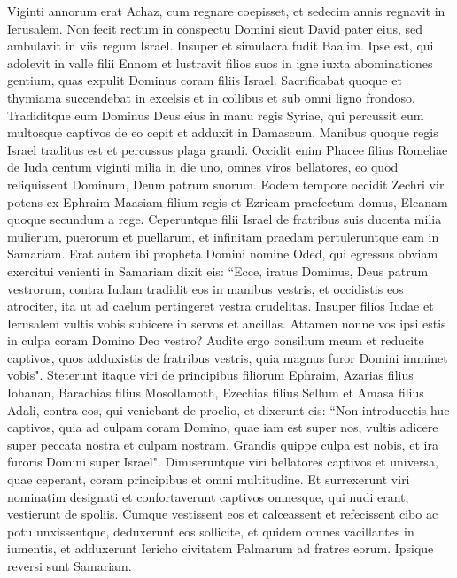 \begin{biblechapter}  
\verse Viginti annorum erat Achaz, cum regnare coepisset, et sedecim annis regnavit in Ierusalem. Non fecit rectum in conspectu Domini sicut David pater eius, 
\verse sed ambulavit in viis regum Israel. Insuper et simulacra fudit Baalim. 
\verse Ipse est, qui adolevit in valle filii Ennom et lustravit filios suos in igne iuxta abominationes gentium, quas expulit Dominus coram filiis Israel. 
\verse Sacrificabat quoque et thymiama succendebat in excelsis et in collibus et sub omni ligno frondoso. 
\verse Tradiditque eum Dominus Deus eius in manu regis Syriae, qui percussit eum multosque captivos de eo cepit et adduxit in Damascum. Manibus quoque regis Israel traditus est et percussus plaga grandi. 
\verse Occidit enim Phacee filius Romeliae de Iuda centum viginti milia in die uno, omnes viros bellatores, eo quod reliquissent Dominum, Deum patrum suorum. 
\verse Eodem tempore occidit Zechri vir potens ex Ephraim Maasiam filium regis et Ezricam praefectum domus, Elcanam quoque secundum a rege. 
\verse Ceperuntque filii Israel de fratribus suis ducenta milia mulierum, puerorum et puellarum, et infinitam praedam pertuleruntque eam in Samariam. 
\verse Erat autem ibi propheta Domini nomine Oded, qui egressus obviam exercitui venienti in Samariam dixit eis: “Ecce, iratus Dominus, Deus patrum vestrorum, contra Iudam tradidit eos in manibus vestris, et occidistis eos atrociter, ita ut ad caelum pertingeret vestra crudelitas. 
\verse Insuper filios Iudae et Ierusalem vultis vobis subicere in servos et ancillas. Attamen nonne vos ipsi estis in culpa coram Domino Deo vestro? 
\verse Audite ergo consilium meum et reducite captivos, quos adduxistis de fratribus vestris, quia magnus furor Domini imminet vobis". 
\verse Steterunt itaque viri de principibus filiorum Ephraim, Azarias filius Iohanan, Barachias filius Mosollamoth, Ezechias filius Sellum et Amasa filius Adali, contra eos, qui veniebant de proelio, 
\verse et dixerunt eis: “Non introducetis huc captivos, quia ad culpam coram Domino, quae iam est super nos, vultis adicere super peccata nostra et culpam nostram. Grandis quippe culpa est nobis, et ira furoris Domini super Israel". 
\verse Dimiseruntque viri bellatores captivos et universa, quae ceperant, coram principibus et omni multitudine. 
\verse Et surrexerunt viri nominatim designati et confortaverunt captivos omnesque, qui nudi erant, vestierunt de spoliis. Cumque vestissent eos et calceassent et refecissent cibo ac potu unxissentque, deduxerunt eos sollicite, et quidem omnes vacillantes in iumentis, et adduxerunt Iericho civitatem Palmarum ad fratres eorum. Ipsique reversi sunt Samariam. 

\end{biblechapter}
